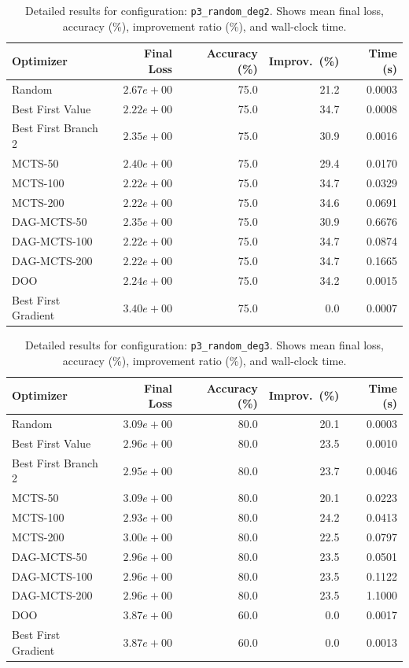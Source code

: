 \begin{table}[H]
\centering
\caption{Detailed results for configuration: \texttt{p3\_random\_deg2}. Shows mean final loss, accuracy (\%), improvement ratio (\%), and wall-clock time.}
\label{tab:funclearn-detail-16}
\begin{tabular}{lrrrr}
\toprule
Optimizer & Final Loss & Accuracy (\%) & Improv.~(\%) & Time (s) \\
\midrule
Random & $2.67e+00$ & 75.0 & 21.2 & 0.0003 \\
\hline
Best First Value & \textbf{$2.22e+00$} & 75.0 & 34.7 & 0.0008 \\
\hline
Best First Branch 2 & $2.35e+00$ & 75.0 & 30.9 & 0.0016 \\
\hline
MCTS-50 & $2.40e+00$ & 75.0 & 29.4 & 0.0170 \\
\hline
MCTS-100 & \textbf{$2.22e+00$} & 75.0 & 34.7 & 0.0329 \\
\hline
MCTS-200 & $2.22e+00$ & 75.0 & 34.6 & 0.0691 \\
\hline
DAG-MCTS-50 & $2.35e+00$ & 75.0 & 30.9 & 0.6676 \\
\hline
DAG-MCTS-100 & $2.22e+00$ & 75.0 & 34.7 & 0.0874 \\
\hline
DAG-MCTS-200 & $2.22e+00$ & 75.0 & 34.7 & 0.1665 \\
\hline
DOO & $2.24e+00$ & 75.0 & 34.2 & 0.0015 \\
\hline
Best First Gradient & $3.40e+00$ & 75.0 & 0.0 & 0.0007 \\
\bottomrule
\end{tabular}
\end{table}

\begin{table}[H]
\centering
\caption{Detailed results for configuration: \texttt{p3\_random\_deg3}. Shows mean final loss, accuracy (\%), improvement ratio (\%), and wall-clock time.}
\label{tab:funclearn-detail-17}
\begin{tabular}{lrrrr}
\toprule
Optimizer & Final Loss & Accuracy (\%) & Improv.~(\%) & Time (s) \\
\midrule
Random & $3.09e+00$ & 80.0 & 20.1 & 0.0003 \\
\hline
Best First Value & $2.96e+00$ & 80.0 & 23.5 & 0.0010 \\
\hline
Best First Branch 2 & $2.95e+00$ & 80.0 & 23.7 & 0.0046 \\
\hline
MCTS-50 & $3.09e+00$ & 80.0 & 20.1 & 0.0223 \\
\hline
MCTS-100 & \textbf{$2.93e+00$} & 80.0 & 24.2 & 0.0413 \\
\hline
MCTS-200 & $3.00e+00$ & 80.0 & 22.5 & 0.0797 \\
\hline
DAG-MCTS-50 & $2.96e+00$ & 80.0 & 23.5 & 0.0501 \\
\hline
DAG-MCTS-100 & $2.96e+00$ & 80.0 & 23.5 & 0.1122 \\
\hline
DAG-MCTS-200 & $2.96e+00$ & 80.0 & 23.5 & 1.1000 \\
\hline
DOO & $3.87e+00$ & 60.0 & 0.0 & 0.0017 \\
\hline
Best First Gradient & $3.87e+00$ & 60.0 & 0.0 & 0.0013 \\
\bottomrule
\end{tabular}
\end{table}

